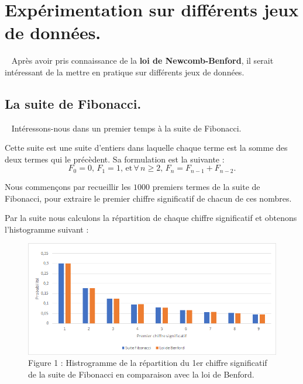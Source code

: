 \documentclass[
  12pt,
]{article}
\begin{document}
\newpage

\hypertarget{expuxe9rimentation-sur-diffuxe9rents-jeux-de-donnuxe9es.}{%
\section{Expérimentation sur différents jeux de
données.}\label{expuxe9rimentation-sur-diffuxe9rents-jeux-de-donnuxe9es.}}

~ Après avoir pris connaissance de la \textbf{loi de Newcomb-Benford},
il serait intéressant de la mettre en pratique sur différents jeux de
données.

\hypertarget{la-suite-de-fibonacci.}{%
\subsection{La suite de Fibonacci.}\label{la-suite-de-fibonacci.}}

~ Intéressons-nous dans un premier temps à la suite de Fibonacci.

Cette suite est une suite d'entiers dans laquelle chaque terme est la
somme des deux termes qui le précèdent. Sa formulation est la suivante :
\[F_{0} = 0, \, F_{1} = 1, \, \text{et} \, \forall \, n \ge 2, \, F_n = F_{n - 1} + F_{n - 2}.\]

Nous commençons par recueillir les \(1000\) premiers termes de la suite
de Fibonacci, pour extraire le premier chiffre significatif de chacun de
ces nombres.

Par la suite nous calculons la répartition de chaque chiffre
significatif et obtenons l'histogramme suivant :

\begin{figure}
\centering
\includegraphics{Images/histogramme_Fibonacci.png}
\caption{Figure 1 : Histrogramme de la répartition du 1er chiffre
significatif de la suite de Fibonacci en comparaison avec la loi de
Benford.}
\end{figure}
\end{document}
